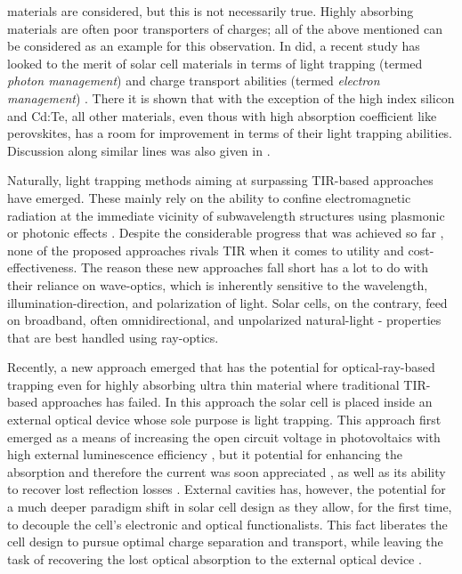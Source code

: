 \documentclass[a4paper]{article}
\begin{document}
materials are considered, but this is not necessarily true. Highly absorbing materials are often poor transporters of charges; all of the above mentioned can be considered as an example for this observation. In did, a recent study has looked to the merit of solar cell materials in terms of light trapping (termed \emph{photon management}) and charge transport abilities (termed \emph{electron management}) \cite{Polman2016}. There it is shown that with the exception of the high index silicon and Cd:Te, all other materials, even thous with high absorption coefficient like perovskites, has a room for improvement in terms of their light trapping abilities. Discussion along similar lines was also given in \cite{Green2016}.

Naturally, light trapping methods aiming at surpassing TIR-based approaches have emerged. These mainly rely on the ability to confine electromagnetic radiation at the immediate vicinity of subwavelength structures using plasmonic or photonic effects \cite{Atwater2010a, Polman2012a}. Despite the considerable progress that was achieved so far \cite{Pala2009, Massiot2012}, none of the proposed approaches rivals TIR when it comes to utility and cost-effectiveness. The reason these new approaches fall short has a lot to do with their reliance on wave-optics, which is inherently sensitive to the wavelength, illumination-direction, and polarization of light. Solar cells, on the contrary, feed on broadband, often omnidirectional, and unpolarized natural-light - properties that are best handled using ray-optics.  

Recently, a new approach emerged that has the potential for optical-ray-based trapping even for highly absorbing ultra thin material where traditional TIR-based approaches has failed. In this approach the solar cell is placed inside an external optical device whose sole purpose is light trapping. This approach first emerged as a means of increasing the open circuit voltage in photovoltaics with high external luminescence efficiency \cite{Braun2013_external_recycling}, but it potential for enhancing the absorption and therefore the current was soon appreciated \cite{Weinstein2014a,Weinstein2015b,Niv2016a}, as well as its ability to recover lost reflection losses \cite{VanDijk2016a}. External cavities has, however, the potential for a much deeper paradigm shift in solar cell design as they allow, for the first time, to decouple the cell's electronic and optical functionalists. This fact liberates the cell design to pursue optimal charge separation and transport, while leaving the task of recovering the lost optical absorption to the external optical device \cite{VanDijk2016a}. 
\end{document}
